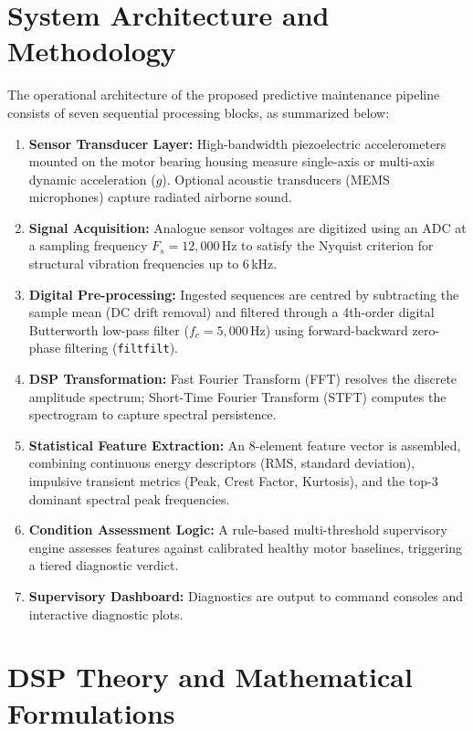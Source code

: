\documentclass[conference,a4paper]{IEEEtran}
\begin{document}
\section{System Architecture and Methodology}
The operational architecture of the proposed predictive maintenance pipeline consists of seven sequential processing blocks, as summarized below:
\begin{enumerate}
    \item \textbf{Sensor Transducer Layer:} High-bandwidth piezoelectric accelerometers mounted on the motor bearing housing measure single-axis or multi-axis dynamic acceleration ($g$). Optional acoustic transducers (MEMS microphones) capture radiated airborne sound.
    \item \textbf{Signal Acquisition:} Analogue sensor voltages are digitized using an ADC at a sampling frequency $F_s = 12{,}000$\,Hz to satisfy the Nyquist criterion for structural vibration frequencies up to 6\,kHz.
    \item \textbf{Digital Pre-processing:} Ingested sequences are centred by subtracting the sample mean (DC drift removal) and filtered through a 4th-order digital Butterworth low-pass filter ($f_c = 5{,}000$\,Hz) using forward-backward zero-phase filtering (\texttt{filtfilt}).
    \item \textbf{DSP Transformation:} Fast Fourier Transform (FFT) resolves the discrete amplitude spectrum; Short-Time Fourier Transform (STFT) computes the spectrogram to capture spectral persistence.
    \item \textbf{Statistical Feature Extraction:} An 8-element feature vector is assembled, combining continuous energy descriptors (RMS, standard deviation), impulsive transient metrics (Peak, Crest Factor, Kurtosis), and the top-3 dominant spectral peak frequencies.
    \item \textbf{Condition Assessment Logic:} A rule-based multi-threshold supervisory engine assesses features against calibrated healthy motor baselines, triggering a tiered diagnostic verdict.
    \item \textbf{Supervisory Dashboard:} Diagnostics are output to command consoles and interactive diagnostic plots.
\end{enumerate}

\section{DSP Theory and Mathematical Formulations}
\end{document}
